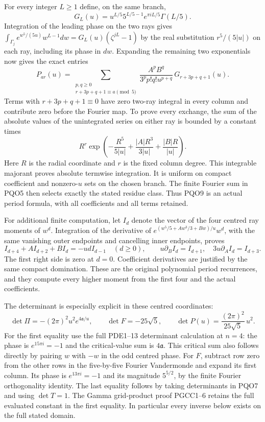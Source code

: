 \documentclass[11pt,a4paper]{article}
\begin{document}
For every integer $L\geq1$ define, on the same branch,
\[
 G_L(u)=u^{L/5}5^{L/5-1}e^{\pi iL/5}\Gamma(L/5).
 \tag{PQO8}
\]
Integration of the leading phase on the two rays gives
$\int_{\Gamma_j}e^{w^5/(5u)}w^{L-1}dw
 =G_L(u)(\zeta^{jL}-1)$ by the real substitution
$r^5/(5|u|)$ on each ray, including its phase in $dw$.
Expanding the remaining two exponentials now gives the exact
entries
\[
\boxed{
 P_{ar}(u)=
 \sum_{\substack{p,q\geq0\\r+3p+q+1\equiv a\pmod5}}
 \frac{A^pB^q}{3^p p!q!u^{p+q}}\,
                 G_{r+3p+q+1}(u).
}\tag{PQO9}
\]
Terms with $r+3p+q+1\equiv0$ have zero two-ray integral
in every column and contribute zero before the Fourier map.
To prove every exchange, the sum of the absolute values of the
unintegrated series on either ray is bounded by a constant times
\[
 R^r\exp\left(-\frac{R^5}{5|u|}
             +\frac{|A|R^3}{3|u|}+\frac{|B|R}{|u|}\right).
\]
Here $R$ is the radial coordinate and $r$ is the fixed column
degree. This integrable majorant
proves absolute termwise integration. It is uniform on compact
coefficient and nonzero-$u$ sets on the chosen branch. The finite
Fourier sum in PQO5 then selects exactly the stated residue class.
Thus PQO9 is an actual period formula, with all coefficients and
all terms retained.

For additional finite computation, let $I_d$ denote the vector
of the four centred ray moments of $w^d$. Integration of the
derivative of $e^{(w^5/5+Aw^3/3+Bw)/u}w^d$, with the same
vanishing outer endpoints and cancelling inner endpoints, proves
\[
 I_{d+4}+A I_{d+2}+B I_d=-ud I_{d-1}\quad(d\geq0),
 \qquad u\partial_B I_d=I_{d+1},\quad
 3u\partial_A I_d=I_{d+3}.
 \tag{PQO10}
\]
The first right side is zero at $d=0$. Coefficient derivatives
are justified by the same compact domination. These are the
original polynomial period recurrences, and they compute every
higher moment from the first four and the actual coefficients.

The determinant is especially explicit in these centred
coordinates:
\[
 \det\Pi=-(2\pi)^2u^2e^{4\mathfrak a/u},\qquad
 \det F=-25\sqrt5,\qquad
 \boxed{\det P(u)=\frac{(2\pi)^2}{25\sqrt5}\,u^2.}
 \tag{PQO11}
\]
For the first equality use the full PDE1--13 determinant
calculation at $n=4$: the phase is $e^{15\pi i}=-1$ and
the critical-value sum is $4\mathfrak a$. This critical sum
also follows directly by pairing $w$ with $-w$ in the odd
centred phase. For $F$, subtract row zero from the other rows
in the five-by-five Fourier Vandermonde and expand its first
column. Its phase is $e^{13\pi i}=-1$ and its magnitude
$5^{5/2}$, by the finite Fourier orthogonality identity.
The last equality follows by taking determinants in PQO7 and
using $\det T=1$. The Gamma grid-product proof PGCC1--6 retains
the full evaluated constant in the first equality. In particular
every inverse below exists on the full stated domain.
\end{document}
